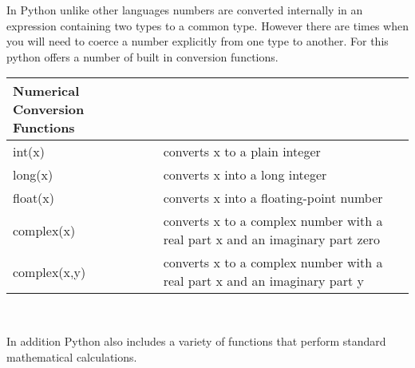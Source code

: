 \documentclass[letterpaper,11pt]{article}
\begin{document}
\par{In Python unlike other languages numbers are converted internally in an
expression containing two types to a common type. However there are times when
you will need to coerce a number explicitly from one type to another. For this
python offers a number of built in conversion functions.}
\\
\begin{tabular}[t]{l l}
    \textbf{Numerical Conversion Functions} &                                                   \\
    \hline
    int(x)       & converts x to a plain integer                                                \\
    long(x)      & converts x into a long integer                                               \\
    float(x)     & converts x into a floating-point number                                      \\
    complex(x)   & converts x to a complex number with a real part x and an imaginary part zero \\
    complex(x,y) & converts x to a complex number with a real part x and an imaginary part y    \\
\end{tabular}
\\
\par{In addition Python also includes a variety of functions that perform
standard mathematical calculations.}
\\
\end{document}
